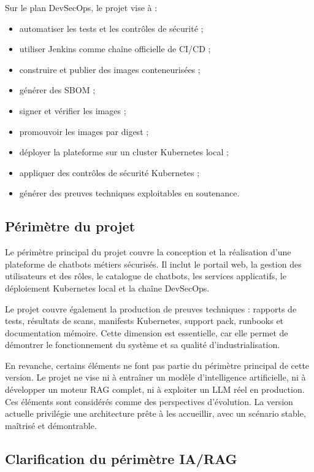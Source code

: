 Sur le plan DevSecOps, le projet vise à :

\begin{itemize}
    \item automatiser les tests et les contrôles de sécurité ;
    \item utiliser Jenkins comme chaîne officielle de CI/CD ;
    \item construire et publier des images conteneurisées ;
    \item générer des SBOM ;
    \item signer et vérifier les images ;
    \item promouvoir les images par digest ;
    \item déployer la plateforme sur un cluster Kubernetes local ;
    \item appliquer des contrôles de sécurité Kubernetes ;
    \item générer des preuves techniques exploitables en soutenance.
\end{itemize}

\subsection{Périmètre du projet}

Le périmètre principal du projet couvre la conception et la réalisation d’une plateforme de chatbots métiers sécurisés. Il inclut le portail web, la gestion des utilisateurs et des rôles, le catalogue de chatbots, les services applicatifs, le déploiement Kubernetes local et la chaîne DevSecOps.

Le projet couvre également la production de preuves techniques : rapports de tests, résultats de scans, manifests Kubernetes, support pack, runbooks et documentation mémoire. Cette dimension est essentielle, car elle permet de démontrer le fonctionnement du système et sa qualité d'industrialisation.

En revanche, certains éléments ne font pas partie du périmètre principal de cette version. Le projet ne vise ni à entraîner un modèle d’intelligence artificielle, ni à développer un moteur RAG complet, ni à exploiter un LLM réel en production. Ces éléments sont considérés comme des perspectives d’évolution. La version actuelle privilégie une architecture prête à les accueillir, avec un scénario stable, maîtrisé et démontrable.

\subsection{Clarification du périmètre IA/RAG}


